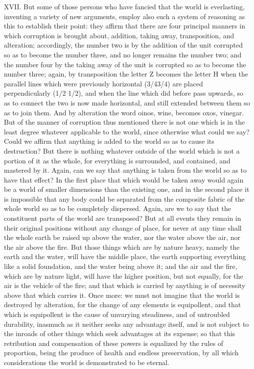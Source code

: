 XVII. But some of those persons who have fancied that the world is everlasting, inventing a variety
of new arguments, employ also such a system of reasoning as this to establish their point: they
affirm that there are four principal manners in which corruption is brought about, addition, taking
away, transposition, and alteration; accordingly, the number two is by the addition of the unit
corrupted so as to become the number three, and no longer remains the number two; and the
number four by the taking away of the unit is corrupted so as to become the number three; again,
by transposition the letter Z becomes the letter H when the parallel lines which were previously
horizontal (3/43/4) are placed perpendicularly (1/2 1/2), and when the line which did before pass
upwards, so as to connect the two is now made horizontal, and still extended between them so as
to join them. And by alteration the word oinos, wine, becomes oxos, vinegar. But of the manner of
corruption thus mentioned there is not one which is in the least degree whatever applicable to the
world, since otherwise what could we say? Could we affirm that anything is added to the world so
as to cause its destruction? But there is nothing whatever outside of the world which is not a
portion of it as the whole, for everything is surrounded, and contained, and mastered by it. Again,
can we say that anything is taken from the world so as to have that effect? In the first place that
which would be taken away would again be a world of smaller dimensions than the existing one, and
in the second place it is impossible that any body could be separated from the composite fabric of
the whole world so as to be completely dispersed. Again, are we to say that the constituent parts of
the world are transposed? But at all events they remain in their original positions without any
change of place, for never at any time shall the whole earth be raised up above the water, nor the
water above the air, nor the air above the fire. But those things which are by nature heavy, namely
the earth and the water, will have the middle place, the earth supporting everything like a solid
foundation, and the water being above it; and the air and the fire, which are by nature light, will have
the higher position, but not equally, for the air is the vehicle of the fire; and that which is carried by
anything is of necessity above that which carries it. Once more: we must not imagine that the world
is destroyed by alteration, for the change of any elements is equipollent, and that which is
equipollent is the cause of unvarying steadiness, and of untroubled durability, inasmuch as it
neither seeks any advantage itself, and is not subject to the inroads of other things which seek
advantages at its expense; so that this retribution and compensation of these powers is equalized
by the rules of proportion, being the produce of health and endless preservation, by all which
considerations the world is demonstrated to be eternal.

